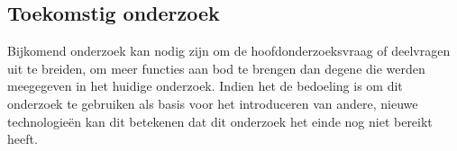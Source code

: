 \documentclass[a0,portrait]{a0poster}
\begin{document}
\begin{multicols}{2}
\color{HoGentAccent1} 
\section*{Toekomstig onderzoek}
\color{black}

Bijkomend onderzoek kan nodig zijn om de hoofdonderzoeksvraag of deelvragen uit te breiden, om meer functies aan bod te brengen dan degene die werden meegegeven in het huidige onderzoek. Indien het de bedoeling is om dit onderzoek te gebruiken als basis voor het introduceren van andere, nieuwe technologieën kan dit betekenen dat dit onderzoek het einde nog niet bereikt heeft.



\end{multicols}
\end{document}
